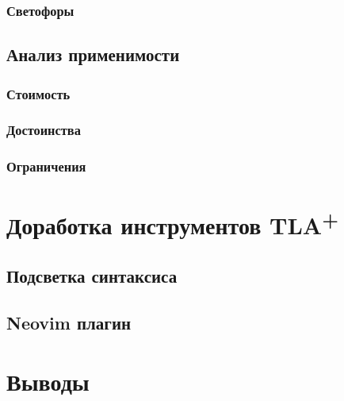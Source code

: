 \documentclass[14pt, openany]{book}
\newcommand{\tla}{TLA\textsuperscript{+}}
\begin{document}
\subsection{Светофоры}

\section{Анализ применимости}

\subsection{Стоимость}

\subsection{Достоинства}

\subsection{Ограничения}

\chapter{Доработка инструментов \tla}

\section{Подсветка синтаксиса}

\section{Neovim плагин}

\chapter{Выводы}



\end{document}
